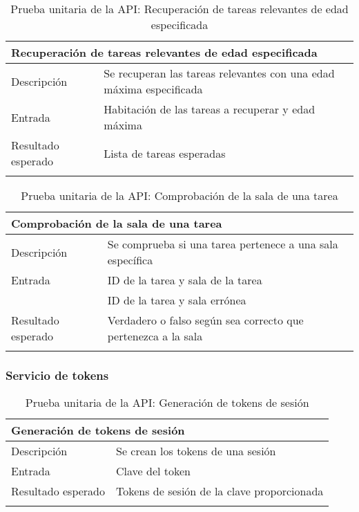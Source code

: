 \begin{longtable}{|p{} p{}|}
    \hline
    \multicolumn{2}{|l|}{\textbf{Recuperación de tareas relevantes de edad especificada}} \\ \hline 
    Descripción                 & Se recuperan las tareas relevantes con una edad máxima especificada \\ \hline
    Entrada                     & Habitación de las tareas a recuperar y edad máxima \\ \hline
    Resultado esperado          & Lista de tareas esperadas \\ \hline
    \caption{Prueba unitaria de la API: Recuperación de tareas relevantes de edad especificada}
    \label{cp:u:api:recuperar_tareas_edad}
\end{longtable}

\vspace{-20pt}
\begin{longtable}{|p{} p{}|}
    \hline
    \multicolumn{2}{|l|}{\textbf{Comprobación de la sala de una tarea}} \\ \hline 
    Descripción                 & Se comprueba si una tarea pertenece a una sala específica \\ \hline
    Entrada                     & ID de la tarea y sala de la tarea \\
                                & ID de la tarea y sala errónea \\ \hline
    Resultado esperado          & Verdadero o falso según sea correcto que pertenezca a la sala \\ \hline
    \caption{Prueba unitaria de la API: Comprobación de la sala de una tarea}
    \label{cp:u:api:comprobar_sala_tarea}
\end{longtable}

\subsubsection{Servicio de tokens}

\begin{longtable}{|p{} p{}|}
    \hline
    \multicolumn{2}{|l|}{\textbf{Generación de tokens de sesión}} \\ \hline 
    Descripción                 & Se crean los tokens de una sesión \\ \hline
    Entrada                     & Clave del token \\ \hline
    Resultado esperado          & Tokens de sesión de la clave proporcionada \\  \hline
    \caption{Prueba unitaria de la API: Generación de tokens de sesión}
    \label{cp:u:api:generar_token_sesion}
\end{longtable}

